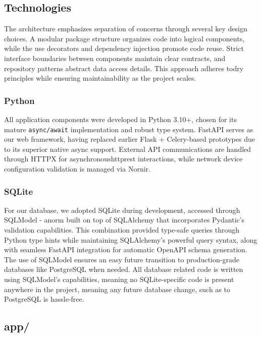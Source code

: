     \subsection{Technologies}

        The architecture emphasizes separation of concerns through several key design choices. A modular package structure 
        organizes code into logical components, while the use decorators and dependency injection promote code reuse. 
        Strict interface boundaries between components maintain clear contracts, and repository patterns abstract data 
        access details. This approach adheres to\ac{dry} principles while ensuring maintainability as the project scales.
        
        \subsubsection{Python}
            All application components were developed in Python 3.10+, chosen for its mature \texttt{async/await} implementation and 
            robust type system. FastAPI serves as our web framework, having replaced earlier Flask + Celery-based prototypes 
            due to its superior native async support. External API communications are handled through HTTPX for 
            asynchronous\ac{http}\ac{rest} interactions, while network device configuration validation is managed via Nornir.

        \subsubsection{SQLite}
            For our database, we adopted SQLite during development, accessed through SQLModel - an\ac{orm} built on top of SQLAlchemy 
            that incorporates Pydantic's validation capabilities. This combination provided type-safe queries through Python type 
            hints while maintaining SQLAlchemy's powerful query syntax, along with seamless FastAPI integration for automatic 
            OpenAPI schema generation. The use of SQLModel ensures an easy future transition to production-grade databases 
            like PostgreSQL when needed. All database related code is written using SQLModel's capabilities, meaning no SQLite-specific 
            code is present anywhere in the project, meaning any future database change, such as to PostgreSQL is hassle-free.


    \subsection{app/}

